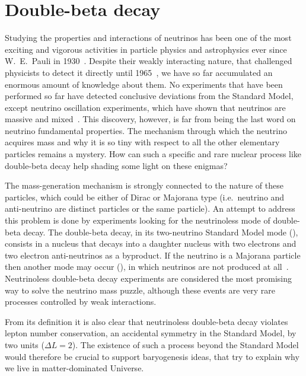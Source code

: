 
\chapter{Double-beta decay}\label{chap:theory}

Studying the properties and interactions of neutrinos has been one of the most
exciting and vigorous activities in particle physics and astrophysics ever
since W.~E.~Pauli in 1930~\cite{Brown1978}. Despite their weakly interacting
nature, that challenged physicists to detect it directly until
1965~\cite{Cowan1956}, we have so far accumulated an enormous amount of
knowledge about them. No experiments that have been performed so far have
detected conclusive deviations from the Standard Model, except neutrino
oscillation experiments, which have shown that neutrinos are massive and
mixed~\cite{Fukuda1998, Ahmad2002, Eguchi2003, Kajita2016, McDonald2016}.
This discovery, however, is far from being the last word on neutrino
fundamental properties. The mechanism through which the neutrino acquires mass
and why it is so tiny with respect to all the other elementary
particles remains a mystery. How can such a specific and rare nuclear process
like double-beta decay help shading some light on these enigmas?

The mass-generation mechanism is strongly connected to the nature of these
particles, which could be either of Dirac or Majorana type (i.e.~neutrino and
anti-neutrino are distinct particles or the same particle). An attempt to
address this problem is done by experiments looking for the neutrinoless mode
of double-beta decay. The double-beta decay, in its two-neutrino Standard Model
mode (\nnbb), consists in a nucleus that decays into a daughter nucleus with
two electrons and two electron anti-neutrinos as a byproduct. If the neutrino
is a Majorana particle then another mode may occur (\onbb), in which
neutrinos are not produced at all~\cite{Schechter1982}. Neutrinoless
double-beta decay experiments are considered the most promising way to solve
the neutrino mass puzzle, although these events are very rare processes
controlled by weak interactions.

From its definition it is also clear that neutrinoless double-beta decay
violates lepton number conservation, an accidental symmetry in the Standard
Model, by two units ($\Delta L = 2$). The existence of such a process beyond
the Standard Model would therefore be crucial to support baryogenesis ideas,
that try to explain why we live in matter-dominated Universe.

